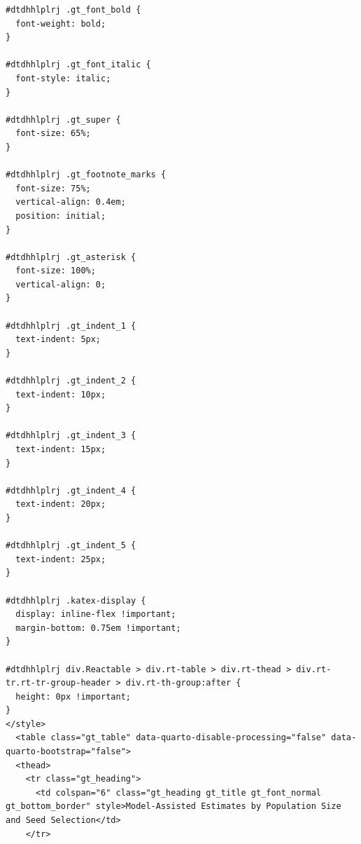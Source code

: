 \documentclass[
  12pt,
  letterpaper,
  DIV=11,
  numbers=noendperiod]{scrartcl}
\theoremstyle{plain}
\theoremstyle{definition}
\begin{document}
\begin{table}
{\begin{verbatim}
#dtdhhlplrj .gt_font_bold {
  font-weight: bold;
}

#dtdhhlplrj .gt_font_italic {
  font-style: italic;
}

#dtdhhlplrj .gt_super {
  font-size: 65%;
}

#dtdhhlplrj .gt_footnote_marks {
  font-size: 75%;
  vertical-align: 0.4em;
  position: initial;
}

#dtdhhlplrj .gt_asterisk {
  font-size: 100%;
  vertical-align: 0;
}

#dtdhhlplrj .gt_indent_1 {
  text-indent: 5px;
}

#dtdhhlplrj .gt_indent_2 {
  text-indent: 10px;
}

#dtdhhlplrj .gt_indent_3 {
  text-indent: 15px;
}

#dtdhhlplrj .gt_indent_4 {
  text-indent: 20px;
}

#dtdhhlplrj .gt_indent_5 {
  text-indent: 25px;
}

#dtdhhlplrj .katex-display {
  display: inline-flex !important;
  margin-bottom: 0.75em !important;
}

#dtdhhlplrj div.Reactable > div.rt-table > div.rt-thead > div.rt-tr.rt-tr-group-header > div.rt-th-group:after {
  height: 0px !important;
}
</style>
  <table class="gt_table" data-quarto-disable-processing="false" data-quarto-bootstrap="false">
  <thead>
    <tr class="gt_heading">
      <td colspan="6" class="gt_heading gt_title gt_font_normal gt_bottom_border" style>Model-Assisted Estimates by Population Size and Seed Selection</td>
    </tr>
    

\end{verbatim}}
\end{table}
\end{document}
